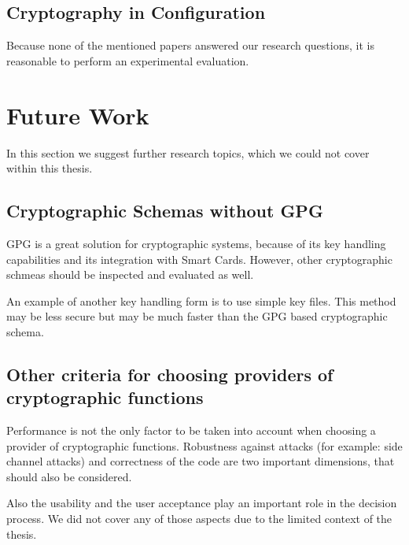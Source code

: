 	\subsection{Cryptography in Configuration}

Because none of the mentioned papers answered our research questions, it is reasonable to perform an experimental evaluation.

\section{Future Work}

In this section we suggest further research topics, which we could not cover within this thesis.

	\subsection{Cryptographic Schemas without GPG}

GPG is a great solution for cryptographic systems, because of its key handling capabilities and its integration with Smart Cards.
However, other cryptographic schmeas should be inspected and evaluated as well.

An example of another key handling form is to use simple key files.
This method may be less secure but may be much faster than the GPG based cryptographic schema.

	\subsection{Other criteria for choosing providers of cryptographic functions}

Performance is not the only factor to be taken into account when choosing a provider of cryptographic functions.
Robustness against attacks (for example: side channel attacks) and correctness of the code are two important dimensions, that should also be considered.

Also the usability and the user acceptance play an important role in the decision process.
We did not cover any of those aspects due to the limited context of the thesis.
